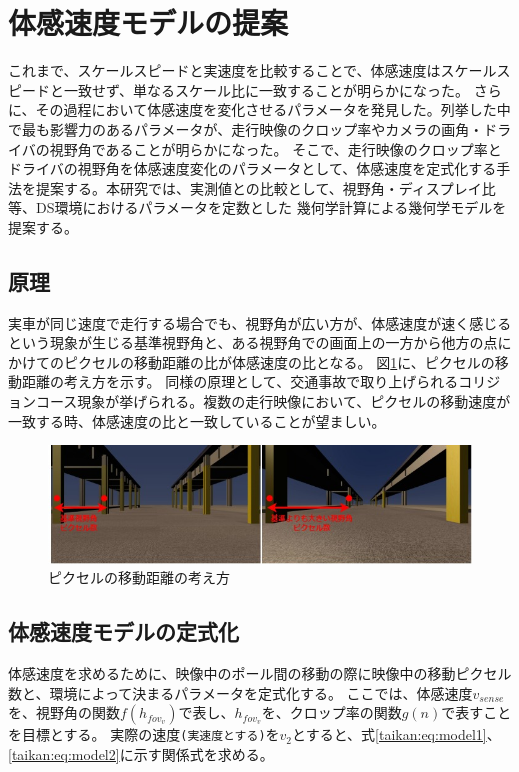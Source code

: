 \section{体感速度モデルの提案}
これまで、スケールスピードと実速度を比較することで、体感速度はスケールスピードと一致せず、単なるスケール比に一致することが明らかになった。
さらに、その過程において体感速度を変化させるパラメータを発見した。列挙した中で最も影響力のあるパラメータが、走行映像のクロップ率やカメラの画角・ドライバの視野角であることが明らかになった。
そこで、走行映像のクロップ率とドライバの視野角を体感速度変化のパラメータとして、体感速度を定式化する手法を提案する。本研究では、実測値との比較として、視野角・ディスプレイ比等、DS環境におけるパラメータを定数とした
幾何学計算による幾何学モデルを提案する。

\subsection{原理}
実車が同じ速度で走行する場合でも、視野角が広い方が、体感速度が速く感じるという現象が生じる基準視野角と、ある視野角での画面上の一方から他方の点にかけてのピクセルの移動距離の比が体感速度の比となる。
図\ref{taikan:pixel}に、ピクセルの移動距離の考え方を示す。
同様の原理として、交通事故で取り上げられるコリジョンコース現象が挙げられる。複数の走行映像において、ピクセルの移動速度が一致する時、体感速度の比と一致していることが望ましい。

\begin{figure}[h]
  \begin{center}
  \includegraphics[width=.65\linewidth]{img/11.jpg}
  \caption{ピクセルの移動距離の考え方}
  \label{taikan:pixel}
  \end{center}
\end{figure}

\clearpage
\subsection{体感速度モデルの定式化}
体感速度を求めるために、映像中のポール間の移動の際に映像中の移動ピクセル数と、環境によって決まるパラメータを定式化する。
ここでは、体感速度$v_{sense}$を、視野角の関数$f(h_{fov_v})$で表し、$h_{fov_v}$を、クロップ率の関数$g(n)$で表すことを目標とする。
実際の速度\verb|(実速度とする)|を$v_2$とすると、式\eqref{taikan:eq:model1}、\eqref{taikan:eq:model2}に示す関係式を求める。

